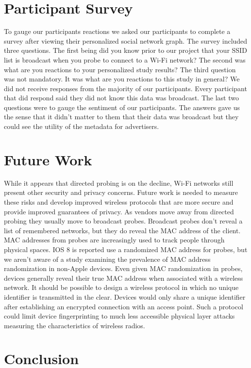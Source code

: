 \documentclass[letterpaper,twocolumn,10pt]{article}
\begin{document}
\section{Participant Survey}


To gauge our participants reactions we asked our participants to complete a survey after viewing their personalized social network graph. The survey included three questions. The first being did you know prior to our project that your SSID list is broadcast when you probe to connect to a Wi-Fi network? The second was what are you reactions to your personalized study results? The third question was not mandatory. It was what are you reactions to this study in general? We did not receive responses from the majority of our participants. Every participant that did respond said they did not know this data was broadcast. The last two questions were to gauge the sentiment of our participants. The answers gave us the sense that it didn't matter to them that their data was broadcast but they could see the utility of the metadata for advertisers.


\section{Future Work}
While it appears that directed probing is on the decline, Wi-Fi networks still present other security and privacy concerns. Future work is needed to measure these risks and develop improved wireless protocols that are more secure and provide improved guarantees of privacy. As vendors move away from directed probing they usually move to broadcast probes. Broadcast probes don't reveal a list of remembered networks, but they do reveal the MAC address of the client. MAC addresses from probes are increasingly used to track people through physical spaces. IOS 8 is reported use a randomized MAC address for probes, but we aren't aware of a study examining the prevalence of MAC address randomization in non-Apple devices. Even given MAC randomization in probes, devices generally reveal their true MAC address when associated with a wireless network. It should be possible to design a wireless protocol in which no unique identifier is transmitted in the clear. Devices would only share a unique identifier after establishing an encrypted connection with an access point. Such a protocol could limit device fingerprinting to much less accessible physical layer attacks measuring the characteristics of wireless radios.

\section{Conclusion}





\end{document}
